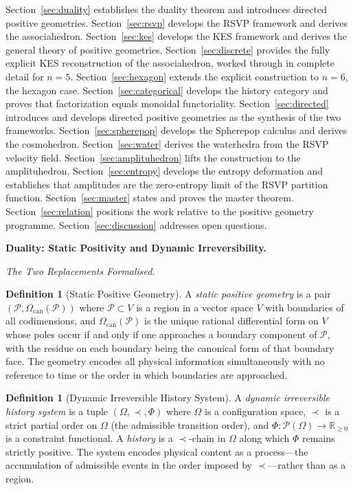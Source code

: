 \documentclass[12pt, oneside]{amsart}
\theoremstyle{plain}
\theoremstyle{definition}
\newtheorem{definition}[theorem]{Definition}
\theoremstyle{remark}
\newcommand{\R}{\mathbb{R}}
\newcommand{\Phif}{\Phi}
\newcommand{\OmKS}{\Omega}
\newcommand{\CF}{\Omega_{\mathrm{can}}}
\begin{document}
Section~\ref{sec:duality} establishes the duality theorem and introduces directed positive geometries. Section~\ref{sec:rsvp} develops the RSVP framework and derives the associahedron. Section~\ref{sec:kes} develops the KES framework and derives the general theory of positive geometries. Section~\ref{sec:discrete} provides the fully explicit KES reconstruction of the associahedron, worked through in complete detail for $n=5$. Section~\ref{sec:hexagon} extends the explicit construction to $n=6$, the hexagon case. Section~\ref{sec:categorical} develops the history category and proves that factorization equals monoidal functoriality. Section~\ref{sec:directed} introduces and develops directed positive geometries as the synthesis of the two frameworks. Section~\ref{sec:spherepop} develops the Spherepop calculus and derives the cosmohedron. Section~\ref{sec:water} derives the waterhedra from the RSVP velocity field. Section~\ref{sec:amplituhedron} lifts the construction to the amplituhedron. Section~\ref{sec:entropy} develops the entropy deformation and establishes that amplitudes are the zero-entropy limit of the RSVP partition function. Section~\ref{sec:master} states and proves the master theorem. Section~\ref{sec:relation} positions the work relative to the positive geometry programme. Section~\ref{sec:discussion} addresses open questions.

\bigskip\noindent\textbf{Duality: Static Positivity and Dynamic Irreversibility.}
\label{sec:duality}

\medskip\noindent\textit{The Two Replacements Formalised.}

\begin{definition}[Static Positive Geometry]
A \emph{static positive geometry} is a pair $(\mathcal{P}, \CF(\mathcal{P}))$ where $\mathcal{P} \subset V$ is a region in a vector space $V$ with boundaries of all codimensions, and $\CF(\mathcal{P})$ is the unique rational differential form on $V$ whose poles occur if and only if one approaches a boundary component of $\mathcal{P}$, with the residue on each boundary being the canonical form of that boundary face. The geometry encodes all physical information simultaneously with no reference to time or the order in which boundaries are approached.
\end{definition}

\begin{definition}[Dynamic Irreversible History System]
A \emph{dynamic irreversible history system} is a tuple $(\OmKS, \prec, \Phif)$ where $\OmKS$ is a configuration space, $\prec$ is a strict partial order on $\OmKS$ (the admissible transition order), and $\Phif: \mathcal{P}(\OmKS) \to \R_{\geq 0}$ is a constraint functional. A \emph{history} is a $\prec$-chain in $\OmKS$ along which $\Phif$ remains strictly positive. The system encodes physical content as a process---the accumulation of admissible events in the order imposed by $\prec$---rather than as a region.
\end{definition}
\end{document}
